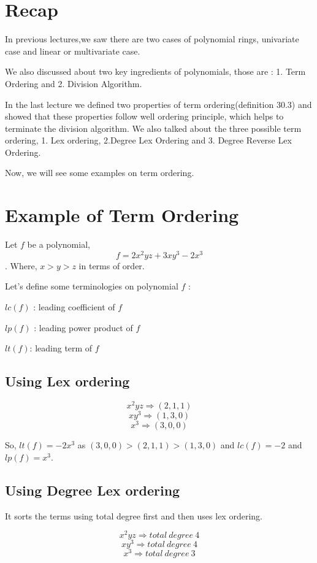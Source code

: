 \section{Recap}
In previous lectures,we saw there are two cases of polynomial rings, univariate case and linear or multivariate case. 

We also discussed about two key ingredients of polynomials, those are : 1. Term Ordering and 2. Division Algorithm.

In the last lecture we defined two properties of term ordering(definition 30.3) and showed that these properties follow well ordering principle, which helps to terminate the division algorithm.
We also talked about the three possible term ordering, 1. Lex ordering, 2.Degree Lex Ordering and 3. Degree Reverse Lex Ordering.

Now, we will see some examples on term ordering.

\section{Example of Term Ordering}

Let $f$ be a polynomial, $$ f = 2x^2yz + 3xy^3 - 2x^3 $$. Where, $x>y>z$ in terms of order.

Let's define some terminologies on polynomial $f$ :

$lc(f)$ : leading coefficient of $f$

$lp(f)$ : leading power product of $f$

$lt(f)$: leading term of $f$

\subsection{Using Lex ordering}

$$x^2yz \Rightarrow (2,1,1)$$
$$xy^3 \Rightarrow (1,3,0)$$
$$x^3 \Rightarrow (3,0,0)$$

So, $lt(f) = -2x^3$ as $(3,0,0)>(2,1,1)>(1,3,0)$ and $lc(f) = -2$ and $lp(f) = x^3$.

\subsection{Using Degree Lex ordering}

It sorts the terms using total degree first and then uses lex ordering.

$$x^2yz \Rightarrow total~degree~4 $$
$$xy^3 \Rightarrow total~degree~4$$
$$x^3 \Rightarrow total~degree~3$$

